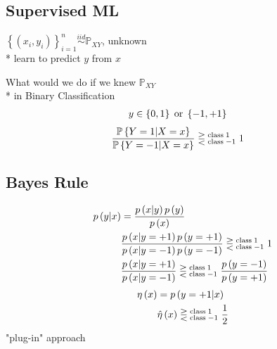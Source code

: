 \documentclass{article}
\begin{document}
\subsection{Supervised ML}
$\left\{\left(x_{i}, y_{i}\right)\right\}_{i=1}^{n} \stackrel{iid}{\sim} \mathbb{P}_{XY}$, unknown
\\* learn to predict $y $ from $x $

What would we do if we knew $\mathbb{P}_{XY}$
\\* in Binary Classification
\begin{align*}
&y  \in \left\{0, 1\right\} \text{\;or\;} \left\{-1, +1\right\}
\end{align*}
\begin{align*}
&\dfrac{\mathbb{P}\left\{Y = 1 | X = x\right\}}{\mathbb{P}\left\{Y = -1 | X = x\right\}} \gtreqless^{\text{\;class\;} 1}_{\text{\;class\;} -1} 1
\end{align*}


\subsection{Bayes Rule}
\begin{align*}
p\left(y | x\right)  &= \dfrac{p\left(x | y\right) p\left(y\right)}{p\left(x\right)}
\\ &\dfrac{p\left(x | y = +1\right) p\left(y = +1\right)}{p\left(x | y = -1\right) p\left(y = -1\right)} \gtreqless^{\text{\;class\;} 1}_{\text{\;class\;} -1} 1
\\ &\dfrac{p\left(x | y = +1\right)}{p\left(x | y = -1\right)} \gtreqless^{\text{\;class\;} 1}_{\text{\;class\;} -1} \dfrac{p\left(y = -1\right)}{p\left(y = +1\right)}
\end{align*}
\begin{align*}
\eta\left(x\right) &= p\left(y = +1 | x \right)
\\ &\hat{\eta}\left(x\right) \gtreqless^{\text{\;class\;} 1}_{\text{\;class\;} -1} \dfrac{1}{2}
\end{align*}
"plug-in" approach
\end{document}
